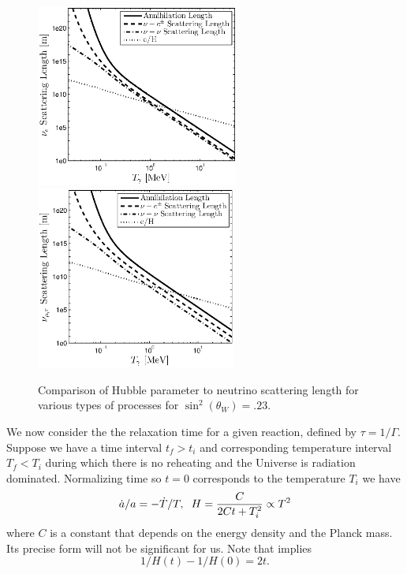 \begin{figure}[ht]
\centerline{\includegraphics[height=6cm]{04-birrell/ParametricStudies/nu_e_scattering_length_eta_0_23.eps}\includegraphics[height=6cm]{04-birrell/ParametricStudies/nu_mu_scattering_length_eta_0_23.eps}}
\caption{Comparison of Hubble parameter to neutrino scattering length for various types of processes for $\sin^2(\theta_W)=.23$. }\label{fig:scatt_length}
\end{figure}


We now consider the the relaxation time for a given reaction, defined by $\tau=1/\Gamma$.  Suppose we have a time interval $t_f>t_i$  and corresponding temperature interval $T_f<T_i$ during which there is no reheating and the Universe is radiation dominated.  Normalizing time so $t=0$ corresponds to the temperature $T_i$ we have
\begin{equation}\label{ch6:H_eq}
\dot a/a=-\dot T/T,\hspace{2mm} H=\frac{C}{2Ct+T_i^2}\propto T^2
\end{equation}
where $C$ is a constant that depends on the energy density and the Planck mass.  Its precise form will not be significant for us.  Note that  implies
\begin{equation}
1/H(t)-1/H(0)=2t.
\end{equation}

